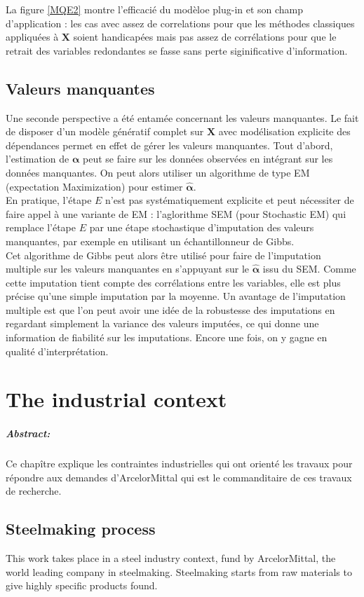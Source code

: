 \documentclass[12pt,a4paper]{report}
\begin{document}
	La figure \ref{MQE2} montre l'efficacié du modèloe plug-in et son champ d'application : les cas avec assez de correlations pour que les méthodes classiques appliquées à $\boldsymbol{X}$ soient handicapées mais pas assez de corrélations pour que le retrait des variables redondantes se fasse sans perte siginificative d'information.
		
	\section{Valeurs manquantes}
		Une seconde perspective a été entamée concernant les valeurs manquantes. Le fait de disposer d'un modèle génératif complet sur $\boldsymbol{X}$ avec modélisation explicite des dépendances permet en effet de gérer les valeurs manquantes. Tout d'abord, l'estimation de $\boldsymbol{\alpha}$ peut se faire sur les données observées en intégrant sur les données manquantes. On peut alors utiliser un algorithme de type EM (expectation Maximization) pour estimer $\hat{\boldsymbol{\alpha}}$.\\
		 En pratique, l'étape $E$ n'est pas systématiquement explicite et peut nécessiter de faire appel à une variante de EM : l'aglorithme SEM (pour Stochastic EM) qui remplace l'étape $E$ par une étape stochastique d'imputation des valeurs manquantes, par exemple en utilisant un échantillonneur de Gibbs. \\
		 Cet algorithme de Gibbs peut alors être utilisé pour faire de l'imputation multiple sur les valeurs manquantes en s'appuyant sur le $\hat{\boldsymbol{\alpha}}$ issu du SEM. Comme cette imputation tient compte des corrélations entre les variables, elle est plus précise qu'une simple imputation par la moyenne. Un avantage de l'imputation multiple est que l'on peut avoir une idée de la robustesse des imputations en regardant simplement la variance des valeurs imputées, ce qui donne une information de fiabilité sur les imputations. Encore une fois, on y gagne en qualité d'interprétation.  
\chapter{The industrial context}
	\paragraph{Abstract:} Ce chapître explique les contraintes industrielles qui ont orienté les travaux pour répondre aux demandes d'ArcelorMittal qui est le commanditaire de ces travaux de recherche.
\section{Steelmaking process}
	This work takes place in a steel industry context, fund by ArcelorMittal, the world leading company in steelmaking.
	Steelmaking starts from raw materials to give highly specific products found.
	
\end{document}
